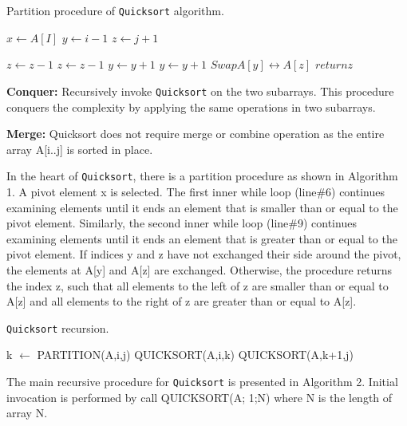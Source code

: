 \documentclass[a4paper, 10pt,twocolumn]{article}
\begin{document}
\begin{algorithm}
\caption{Partition procedure of \texttt{Quicksort} algorithm.}
\begin{algorithmic}[1]

\newline
{}\newline
{}
\State $x \leftarrow A[I]$
\State $y \leftarrow i-1$
\State $z \leftarrow j+1$

    \State $z \leftarrow z-1$
        \State $z \leftarrow z-1$
    \EndWhile
    \State $y \leftarrow y+1$
        \State $y \leftarrow y+1$
    \EndWhile
        \State $Swap A[y] \leftrightarrow A[z]$
    \Else
    \State $return z$
    \EndIf
    \EndWhile
\EndProcedure

\end{algorithmic}
\end{algorithm}
\noindent
\textbf{Conquer:} Recursively invoke \texttt{Quicksort} on the two subarrays. This procedure conquers the complexity by applying the same operations in two subarrays.

\noindent
\textbf{Merge:} Quicksort does not require merge or combine operation as the entire array A[i..j] is sorted in place.

In the heart of \texttt{Quicksort}, there is a partition procedure as shown in Algorithm 1. A pivot element x is selected. The first inner while loop (line\#6) continues examining elements until it ends an
element that is smaller than or equal to the pivot element. Similarly, the second inner while loop (line\#9) continues examining elements until it ends an element that is greater than or equal to the pivot element. If indices y and z have not exchanged their side around the pivot, the elements at A[y] and A[z] are exchanged. Otherwise, the procedure returns the index z, such that all elements to the left of z are smaller than or equal to A[z] and all
elements to the right of z are greater than or equal to A[z].

\begin{algorithm}
\caption{\texttt{Quicksort} recursion.}
\begin{algorithmic}[1]
    \newline
        \State k $\leftarrow$ \textsc{PARTITION}(A,i,j)
        \State \textsc{QUICKSORT}(A,i,k)
        \State \textsc{QUICKSORT}(A,k+1,j)
    \EndIf
\EndProcedure
\end{algorithmic}
\end{algorithm}
The main recursive procedure for \texttt{Quicksort} is presented in Algorithm 2. Initial invocation is performed by call QUICKSORT(A; 1;N) where N is the length of array N.
\end{document}
